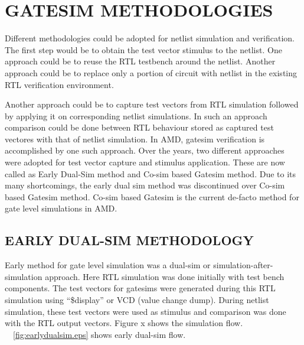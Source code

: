 \chapter{GATESIM METHODOLOGIES}
\label{chap:methodologies.tex}

Different methodologies could be adopted for netlist simulation and verification. The first step would be to obtain the test vector stimulus to the netlist. One approach could be to reuse the RTL testbench around the netlist. Another approach could be to replace only a portion of circuit with netlist in the existing RTL verification environment.

Another approach could be to capture test vectors from RTL simulation followed by applying it on corresponding netlist simulations. In such an approach comparison could be done between RTL behaviour stored as captured test vectores with that of netlist simulation.  In AMD, gatesim verification is accomplished by one such approach. Over the years, two different approaches were adopted for test vector capture and stimulus application. These are now called as Early Dual-Sim method and Co-sim based Gatesim method. Due to its many shortcomings, the early dual sim method was discontinued over Co-sim based Gatesim method. Co-sim based Gatesim is the current de-facto method for gate level simulations in AMD.


\section{EARLY DUAL-SIM METHODOLOGY}
 Early method for gate level simulation was a dual-sim or simulation-after-simulation approach. Here RTL simulation was done initially with test bench components. The test vectors for gatesims were generated during this RTL simulation using ``\$display'' or VCD (value change dump). During netlist simulation, these test vectors were used as stimulus and comparison was done with the RTL output vectors. Figure x shows the simulation flow. ~\figurename{~\ref{fig:earlydualsim.eps}} shows early dual-sim flow. %

